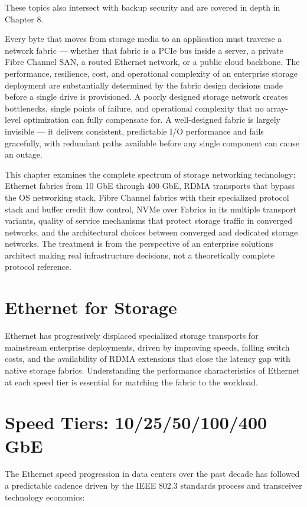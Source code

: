 These topics also intersect with backup security and are covered in depth in Chapter 8.


Every byte that moves from storage media to an application must traverse a network fabric --- whether that fabric is a PCIe bus inside a server, a private Fibre Channel SAN, a routed Ethernet network, or a public cloud backbone. The performance, resilience, cost, and operational complexity of an enterprise storage deployment are substantially determined by the fabric design decisions made before a single drive is provisioned. A poorly designed storage network creates bottlenecks, single points of failure, and operational complexity that no array-level optimization can fully compensate for. A well-designed fabric is largely invisible --- it delivers consistent, predictable I/O performance and fails gracefully, with redundant paths available before any single component can cause an outage.

This chapter examines the complete spectrum of storage networking technology: Ethernet fabrics from 10 GbE through 400 GbE, RDMA transports that bypass the OS networking stack, Fibre Channel fabrics with their specialized protocol stack and buffer credit flow control, NVMe over Fabrics in its multiple transport variants, quality of service mechanisms that protect storage traffic in converged networks, and the architectural choices between converged and dedicated storage networks. The treatment is from the perspective of an enterprise solutions architect making real infrastructure decisions, not a theoretically complete protocol reference.

\section{Ethernet for Storage}
Ethernet has progressively displaced specialized storage transports for mainstream enterprise deployments, driven by improving speeds, falling switch costs, and the availability of RDMA extensions that close the latency gap with native storage fabrics. Understanding the performance characteristics of Ethernet at each speed tier is essential for matching the fabric to the workload.

\section{Speed Tiers: 10/25/50/100/400 GbE}
The Ethernet speed progression in data centers over the past decade has followed a predictable cadence driven by the IEEE 802.3 standards process and transceiver technology economics:

